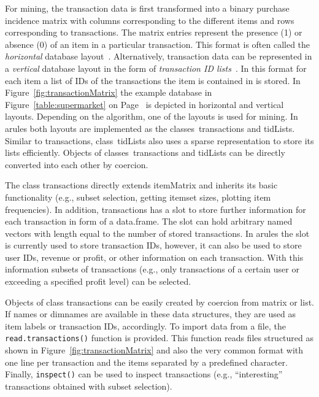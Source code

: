 \documentclass[10pt,a4paper]{article}
\newcommand{\strong}[1]{{\normalfont\fontseries{b}\selectfont #1}}
\newcommand{\class}[1]{\mbox{\textsf{#1}}}
\newcommand{\func}[1]{\mbox{\texttt{#1()}}}
\newcommand{\pkg}[1]{\strong{#1}}
\begin{document}
For mining, the transaction data is first transformed into a binary
purchase incidence matrix with columns corresponding to the different
items and rows corresponding to transactions.  The matrix entries
represent the presence (1) or absence (0) of an item in a particular
transaction.  This format is often called the \emph{horizontal} database
layout~\citep{arules:Zaki:2000}.  Alternatively, transaction data can be
represented in a \emph{vertical} database layout in the form of
\emph{transaction ID lists}~\citep{arules:Zaki:2000}.  In this format
for each item a list of IDs of the transactions the item is contained in
is stored.  In Figure~\ref{fig:transactionMatrix} the example database
in Figure~\ref{table:supermarket} on Page~\pageref{table:supermarket} is
depicted in horizontal and vertical layouts.  Depending on the
algorithm, one of the layouts is used for mining.  In \pkg{arules} both
layouts are implemented as the classes~\class{transactions} and
\class{tidLists}.  Similar to \class{transactions},
class~\class{tidLists} also uses a sparse representation to store its
lists efficiently.  Objects of classes~\class{transactions} and
\class{tidLists} can be directly converted into each other by coercion.

The class \class{transactions} directly extends \class{itemMatrix} and
inherits its basic functionality (e.g., subset selection, getting
itemset sizes, plotting item frequencies).  In addition,
\class{transactions} has a slot to store further information for each
transaction in form of a \class{data.frame}.  The slot can hold
arbitrary named vectors with length equal to the number of stored
transactions.  In \pkg{arules} the slot is currently used to store
transaction IDs, however, it can also be used to store user IDs, revenue
or profit, or other information on each transaction.  With this
information subsets of transactions (e.g., only transactions of a
certain user or exceeding a specified profit level) can be selected.

Objects of class \class{transactions} can be easily created by coercion
from \class{matrix} or \class{list}.  If names or dimnames are available
in these data structures, they are used as item labels or transaction
IDs, accordingly.  To import data from a file, the
\func{read.transactions} function is provided.  This function reads
files structured as shown in Figure~\ref{fig:transactionMatrix} and also
the very common format with one line per transaction and the items
separated by a predefined character.  Finally, \func{inspect} can be
used to inspect transactions (e.g., ``interesting'' transactions
obtained with subset selection).
\end{document}
